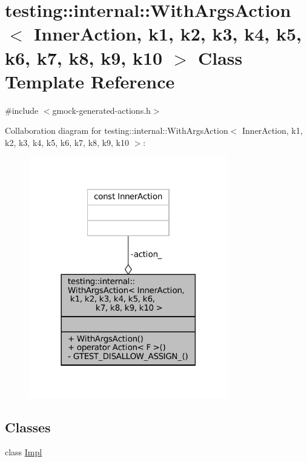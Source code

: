 \hypertarget{classtesting_1_1internal_1_1WithArgsAction}{}\section{testing\+:\+:internal\+:\+:With\+Args\+Action$<$ Inner\+Action, k1, k2, k3, k4, k5, k6, k7, k8, k9, k10 $>$ Class Template Reference}
\label{classtesting_1_1internal_1_1WithArgsAction}


{\ttfamily \#include $<$gmock-\/generated-\/actions.\+h$>$}



Collaboration diagram for testing\+:\+:internal\+:\+:With\+Args\+Action$<$ Inner\+Action, k1, k2, k3, k4, k5, k6, k7, k8, k9, k10 $>$\+:
\nopagebreak
\begin{figure}[H]
\begin{center}
\leavevmode
\includegraphics[width=246pt]{classtesting_1_1internal_1_1WithArgsAction__coll__graph}
\end{center}
\end{figure}
\subsection*{Classes}
\begin{DoxyCompactItemize}
\item 
class \hyperlink{classtesting_1_1internal_1_1WithArgsAction_1_1Impl}{Impl}
\end{DoxyCompactItemize}
